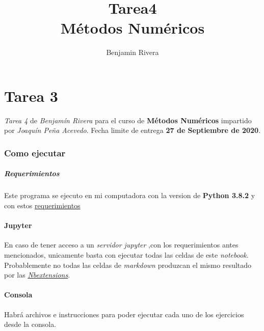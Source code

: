\documentclass[11pt]{article}
\title{Tarea4\\M\'etodos Num\'ericos}
\author{Benjamin Rivera}
\begin{document}
    
    \maketitle
    \tableofcontents
    \newpage
    
    








    \hypertarget{tarea-3}{%
\section{Tarea 3}\label{tarea-3}}

\emph{Tarea 4} de \emph{Benjamín Rivera} para el curso de
\textbf{Métodos Numéricos} impartido por \emph{Joaquín Peña Acevedo}.
Fecha limite de entrega \textbf{27 de Septiembre de 2020}.

    \hypertarget{como-ejecutar}{%
\subsubsection{Como ejecutar}\label{como-ejecutar}}

    \hypertarget{requerimientos}{%
\subparagraph{Requerimientos}\label{requerimientos}}

Este programa se ejecuto en mi computadora con la version de
\textbf{Python 3.8.2} y con estos
\href{https://github.com/BenchHPZ/UG-Compu/blob/master/MN/requerimientos.txt}{requerimientos}

\hypertarget{jupyter}{%
\paragraph{Jupyter}\label{jupyter}}

En caso de tener acceso a un \emph{servidor jupyter} ,con los
requerimientos antes mencionados, unicamente basta con ejecutar todas
las celdas de este \emph{notebook}. Probablemente no todas las celdas de
\emph{markdown} produzcan el mismo resultado por las
\href{jupyter-contrib-nbextensions.readthedocs.io}{\emph{Nbextensions}}.

\hypertarget{consola}{%
\paragraph{Consola}\label{consola}}

Habrá archivos e instrucciones para poder ejecutar cada uno de los
ejercicios desde la consola.
\end{document}
